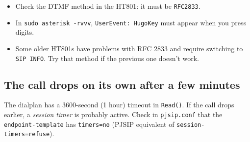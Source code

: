 \begin{itemize}
  \item Check the DTMF method in the HT801: it must be \texttt{RFC2833}.
  \item In \texttt{sudo asterisk -rvvv}, \texttt{UserEvent: HugoKey} must appear when you press digits.
  \item Some older HT801s have problems with RFC 2833 and require switching to \texttt{SIP INFO}. Try that method if the previous one doesn't work.
\end{itemize}

\subsection{The call drops on its own after a few minutes}

The dialplan has a 3600-second (1 hour) timeout in \texttt{Read()}. If the call drops earlier, a \emph{session timer} is probably active. Check in \texttt{pjsip.conf} that the \texttt{endpoint-template} has \texttt{timers=no} (PJSIP equivalent of \texttt{session-timers=refuse}).
